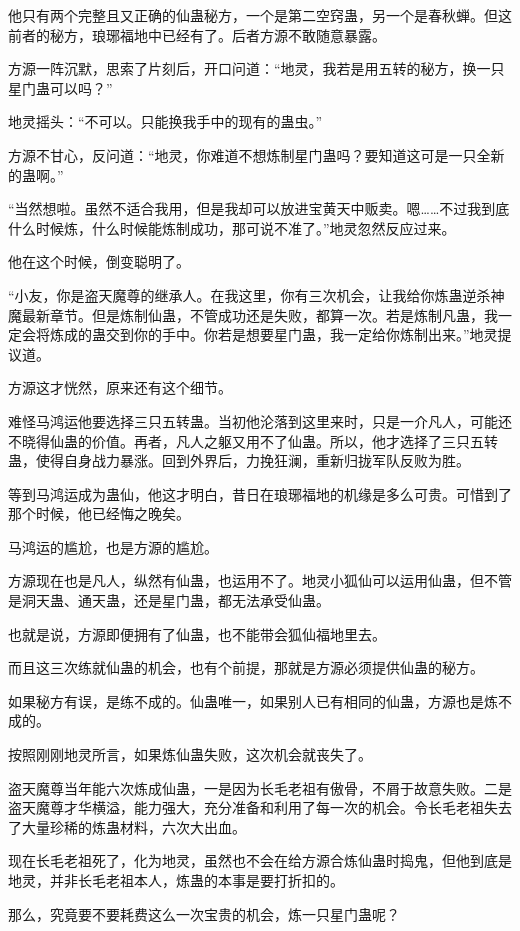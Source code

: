 \begin{this_body}
他只有两个完整且又正确的仙蛊秘方，一个是第二空窍蛊，另一个是春秋蝉。但这前者的秘方，琅琊福地中已经有了。后者方源不敢随意暴露。

方源一阵沉默，思索了片刻后，开口问道：“地灵，我若是用五转的秘方，换一只星门蛊可以吗？”

地灵摇头：“不可以。只能换我手中的现有的蛊虫。”

方源不甘心，反问道：“地灵，你难道不想炼制星门蛊吗？要知道这可是一只全新的蛊啊。”

“当然想啦。虽然不适合我用，但是我却可以放进宝黄天中贩卖。嗯……不过我到底什么时候炼，什么时候能炼制成功，那可说不准了。”地灵忽然反应过来。

他在这个时候，倒变聪明了。

“小友，你是盗天魔尊的继承人。在我这里，你有三次机会，让我给你炼蛊逆杀神魔最新章节。但是炼制仙蛊，不管成功还是失败，都算一次。若是炼制凡蛊，我一定会将炼成的蛊交到你的手中。你若是想要星门蛊，我一定给你炼制出来。”地灵提议道。

方源这才恍然，原来还有这个细节。

难怪马鸿运他要选择三只五转蛊。当初他沦落到这里来时，只是一介凡人，可能还不晓得仙蛊的价值。再者，凡人之躯又用不了仙蛊。所以，他才选择了三只五转蛊，使得自身战力暴涨。回到外界后，力挽狂澜，重新归拢军队反败为胜。

等到马鸿运成为蛊仙，他这才明白，昔日在琅琊福地的机缘是多么可贵。可惜到了那个时候，他已经悔之晚矣。

马鸿运的尴尬，也是方源的尴尬。

方源现在也是凡人，纵然有仙蛊，也运用不了。地灵小狐仙可以运用仙蛊，但不管是洞天蛊、通天蛊，还是星门蛊，都无法承受仙蛊。

也就是说，方源即便拥有了仙蛊，也不能带会狐仙福地里去。

而且这三次练就仙蛊的机会，也有个前提，那就是方源必须提供仙蛊的秘方。

如果秘方有误，是练不成的。仙蛊唯一，如果别人已有相同的仙蛊，方源也是炼不成的。

按照刚刚地灵所言，如果炼仙蛊失败，这次机会就丧失了。

盗天魔尊当年能六次炼成仙蛊，一是因为长毛老祖有傲骨，不屑于故意失败。二是盗天魔尊才华横溢，能力强大，充分准备和利用了每一次的机会。令长毛老祖失去了大量珍稀的炼蛊材料，六次大出血。

现在长毛老祖死了，化为地灵，虽然也不会在给方源合炼仙蛊时捣鬼，但他到底是地灵，并非长毛老祖本人，炼蛊的本事是要打折扣的。

那么，究竟要不要耗费这么一次宝贵的机会，炼一只星门蛊呢？


\end{this_body}
